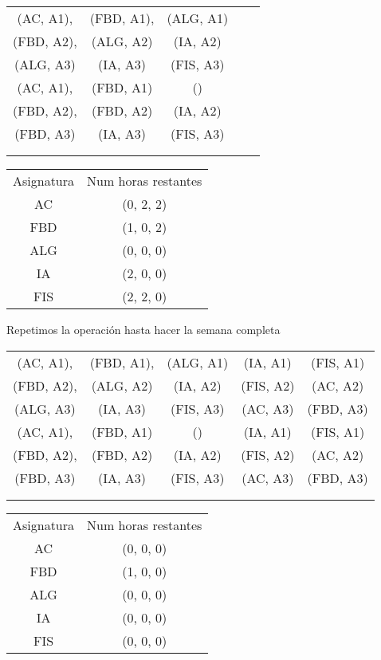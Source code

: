 \begin{minipage}{0.7\textwidth}    
\begin{tabular}{| c | c | c | c | c |}
\hline
 (AC, A1), & (FBD, A1), & (ALG, A1) &  & \\
 (FBD, A2), & (ALG, A2) & (IA, A2) &  & \\
 (ALG, A3) &  (IA, A3) & (FIS, A3) &  & \\
 \hline
 (AC, A1), & (FBD, A1) & () &  & \\
 (FBD, A2), & (FBD, A2) & (IA, A2) &  & \\
 (FBD, A3) & (IA, A3) & (FIS, A3) &  & \\
 \hline
 &  &  &  & \\
 \hline
 &  &  &  & \\
 \hline 
\end{tabular}
\end{minipage}
\begin{minipage}{0.8\textwidth}
\begin{tabular}{c | c}
Asignatura & Num horas restantes \\
AC & (0, 2, 2) \\
FBD & (1, 0, 2) \\
ALG & (0, 0, 0) \\
IA & (2, 0, 0) \\
FIS & (2, 2, 0)
\end{tabular}
\end{minipage}

Repetimos la operación hasta hacer la semana completa

\begin{minipage}{0.8\textwidth}    
\begin{tabular}{| c | c | c | c | c |}
\hline
 (AC, A1), & (FBD, A1), & (ALG, A1) & (IA, A1) & (FIS, A1) \\
 (FBD, A2), & (ALG, A2) & (IA, A2) & (FIS, A2) & (AC, A2) \\
 (ALG, A3) &  (IA, A3) & (FIS, A3) & (AC, A3) & (FBD, A3) \\
 \hline
 (AC, A1), & (FBD, A1) & () & (IA, A1) & (FIS, A1) \\
 (FBD, A2), & (FBD, A2) & (IA, A2) & (FIS, A2) & (AC, A2) \\
 (FBD, A3) & (IA, A3) & (FIS, A3) & (AC, A3) & (FBD, A3) \\
 \hline
 &  &  &  & \\
 \hline
 &  &  &  & \\
 \hline 
\end{tabular}
\end{minipage}
\begin{minipage}{1\textwidth}
\begin{tabular}{c | c}
Asignatura & Num horas restantes \\
AC & (0, 0, 0) \\
FBD & (1, 0, 0) \\
ALG & (0, 0, 0) \\
IA & (0, 0, 0) \\
FIS & (0, 0, 0)
\end{tabular}
\end{minipage}

